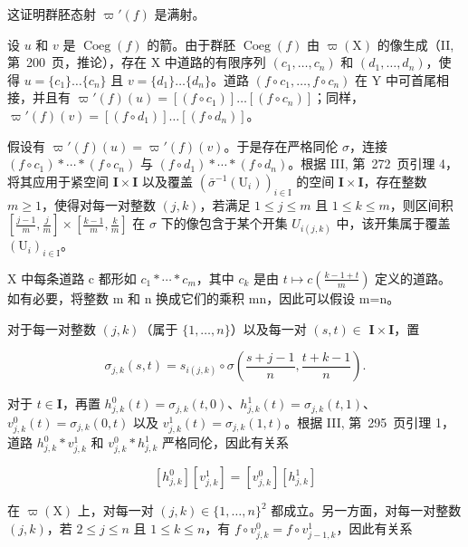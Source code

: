 这证明群胚态射 \(\varpi'(f)\) 是满射。

设 \(u\) 和 \(v\) 是 \(\operatorname{Coeg}(f)\) 的箭。由于群胚 \(\operatorname{Coeg}(f)\) 由 \(\varpi(\mathrm{X})\) 的像生成（II, 第~200~页，推论），存在 X 中道路的有限序列 \((c_1, \ldots, c_n)\) 和 \((d_1, \ldots, d_n)\)，使得 \(u = \{c_1\} \ldots \{c_n\}\) 且 \(v = \{d_1\} \ldots \{d_n\}\)。道路 \((f \circ c_1, \ldots, f \circ c_n)\) 在 Y 中可首尾相接，并且有 \(\varpi'(f)(u) = [(f \circ c_1)] \ldots [(f \circ c_n)]\)；同样，\(\varpi'(f)(v) = [(f \circ d_1)] \ldots [(f \circ d_n)]\)。

假设有 \(\varpi'(f)(u) = \varpi'(f)(v)\)。于是存在严格同伦 \(\sigma\)，连接 \((f \circ c_1) * \cdots * (f \circ c_n)\) 与 \((f \circ d_1) * \cdots * (f \circ d_n)\)。根据 III, 第~272~页引理 4，将其应用于紧空间 \(\mathbf{I} \times \mathbf{I}\) 以及覆盖 \((\bar{\sigma}^{-1}(\mathrm{U}_i))_{i \in \mathrm{I}}\) 的空间 \(\mathbf{I} \times \mathbf{I}\)，存在整数 \(m \geqslant 1\)，使得对每一对整数 \((j,k)\)，若满足 \(1 \leqslant j \leqslant m\) 且 \(1 \leqslant k \leqslant m\)，则区间积 \([\frac{j-1}{m}, \frac{j}{m}] \times [\frac{k-1}{m}, \frac{k}{m}]\) 在 \(\sigma\) 下的像包含于某个开集 \(U_{i(j,k)}\) 中，该开集属于覆盖 \((\mathrm{U}_{i})_{i \in \mathrm{I}}\)。

X 中每条道路 c 都形如 \(c_{1}*\cdots*c_{m}\)，其中 \(c_{k}\) 是由 \(t\mapsto c(\frac{k-1+t}{m})\) 定义的道路。如有必要，将整数 m 和 n 换成它们的乘积 mn，因此可以假设 m=n。

对于每一对整数 \((j,k)\)（属于 \(\{1,\ldots ,n\}\)）以及每一对 \((s,t)\in\) \(\mathbf{I}\times \mathbf{I}\)，置

\[
\sigma_ {j, k} (s, t) = s _ {i (j, k)} \circ \sigma \left(\frac {s + j - 1}{n}, \frac {t + k - 1}{n}\right).
\]

对于 \(t \in \mathbf{I}\)，再置 \(h_{j,k}^{0}(t) = \sigma_{j,k}(t,0)\)、\(h_{j,k}^{1}(t) = \sigma_{j,k}(t,1)\)、\(v_{j,k}^{0}(t) = \sigma_{j,k}(0,t)\) 以及 \(v_{j,k}^{1}(t) = \sigma_{j,k}(1,t)\)。根据 III, 第~295~页引理 1，道路 \(h_{j,k}^{0} * v_{j,k}^{1}\) 和 \(v_{j,k}^{0} * h_{j,k}^{1}\) 严格同伦，因此有关系

\[
[ h _ {j, k} ^ {0} ] [ v _ {j, k} ^ {1} ] = [ v _ {j, k} ^ {0} ] [ h _ {j, k} ^ {1} ]\tag{2}
\]

在 \(\varpi(\mathrm{X})\) 上，对每一对 \((j,k) \in \{1, \ldots, n\}^2\) 都成立。另一方面，对每一对整数 \((j,k)\)，若 \(2 \leqslant j \leqslant n\) 且 \(1 \leqslant k \leqslant n\)，有 \(f \circ v_{j,k}^0 = f \circ v_{j-1,k}^1\)，因此有关系

